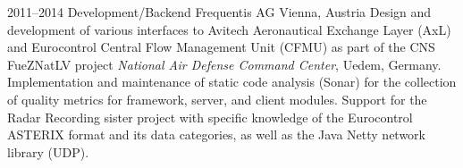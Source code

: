\cventry
{2011--2014}
{Development/Backend}
{}
{Frequentis AG}
{Vienna, Austria}
{
  Design and development of various interfaces to Avitech Aeronautical
  Exchange Layer (AxL) and Eurocontrol Central Flow Management Unit (CFMU)
  as part of the CNS FueZNatLV project \emph{National Air Defense Command Center}, Uedem, Germany.
  Implementation and maintenance of static code analysis (Sonar) for the collection of
  quality metrics for framework, server, and client modules.
  Support for the Radar Recording sister project with specific knowledge
  of the Eurocontrol ASTERIX format and its data categories, as well as the Java Netty
  network library (UDP).
}
